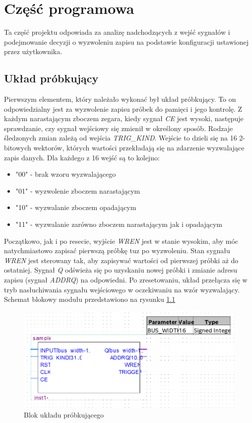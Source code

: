 \chapter{Część programowa}

Ta część projektu odpowiada za analizę nadchodzących z wejść sygnałów i podejmowanie decyzji o wyzwoleniu zapisu na podstawie konfiguracji ustawionej przez użytkownika. 


\section{Układ próbkujący}
	Pierwszym elementem, który należało wykonać był układ próbkujący. To on odpowiedzialny jest za wyzwolenie zapisu próbek do pamięci i jego kontrolę. Z każdym narastającym zboczem zegara, kiedy sygnał \emph{CE} jest wysoki, następuje sprawdzanie, czy sygnał wejściowy się zmienił w określony sposób. Rodzaje śledzonych zmian zależą od wejścia \emph{TRIG\_KIND}. Wejście to dzieli się na 16 2-bitowych wektorów, których wartości przekładają się na zdarzenie wyzwalające zapis danych. Dla każdego z 16 wejść są to kolejno:
	
	\begin{itemize}
		\item "00" - brak wzoru wyzwalającego
		\item "01" - wyzwolenie zboczem narastającym
		\item "10" - wyzwalanie zboczem opadającym
		\item "11" - wyzwalanie zarówno zboczem narastającym jak i opadającym
	\end{itemize}
	
Początkowo, jak i po resecie, wyjście \emph{WREN} jest w stanie wysokim, aby móc natychmiastowo zapisać pierwszą próbkę tuz po wyzwoleniu. Stan sygnału \emph{WREN} jest sterowany tak, aby zapisywać wartości od pierwszej próbki aż do ostatniej. Sygnał \emph{Q} odświeża się po uzyskaniu nowej próbki i zmianie adresu zapisu (sygnał \emph{ADDRQ}) na odpowiedni.
Po zresetowaniu, układ przełącza się w tryb nasłuchiwania sygnału wejściowego w oczekiwaniu na wzór wyzwalający.
Schemat blokowy modułu przedstawiono na rysunku \ref{sampler_block_diagram}

\begin{figure}[H]
	\centering
	\includegraphics[width = 0.4 \paperwidth]{images/sampler_block_diagram.png}
	\caption{Blok układu próbkującego}
	\label{sampler_block_diagram}
\end{figure}
	
